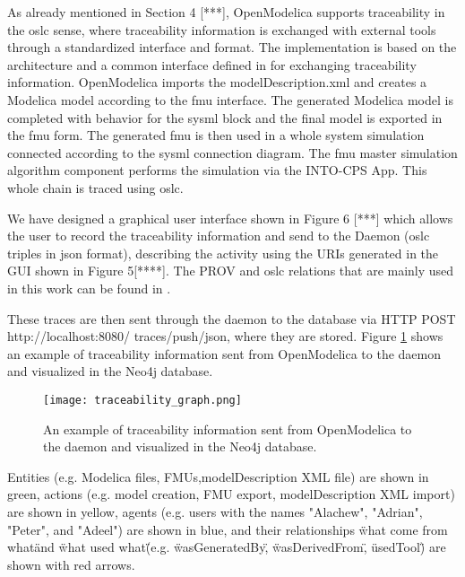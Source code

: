 As already mentioned in Section 4 [***], OpenModelica supports traceability in the \acrshort{oslc} sense, where
traceability information is exchanged with external tools through a standardized interface and format. 
The implementation is based on the architecture and a common interface defined in \cite{intocpskenneth} for 
exchanging traceability information. OpenModelica imports the modelDescription.xml and creates a Modelica model according to the \acrshort{fmu}
interface. The generated Modelica model is completed with behavior for the \acrshort{sysml} block and the final model
is exported in the \acrshort{fmu} form. The generated \acrshort{fmu} is then used in a whole system simulation connected
according to the \acrshort{sysml} connection diagram. The \acrshort{fmu} master simulation algorithm component performs
the simulation via the INTO-CPS App. This whole chain is traced using \acrshort{oslc}.

We have designed a graphical user interface shown in Figure 6 [***] which allows the user to record the
traceability information and send to the Daemon (\acrshort{oslc} triples in \acrshort{json} format), describing the activity
using the URIs generated in the GUI shown in Figure 5[****]. The PROV and \acrshort{oslc} relations that are mainly used
in this work can be found in \cite{intocpsjohn}.
  
These traces are then sent through the daemon to the database via HTTP POST http://localhost:8080/
traces/push/json, where they are stored. Figure \ref{fig:traceabilitygraph} shows an example of traceability information 
sent from OpenModelica to the daemon and visualized in the Neo4j database.
\begin{landscape}
\begin{figure}
	\texttt{[image: traceability\_graph.png]}
	\caption{An example of traceability information sent from OpenModelica to the daemon and visualized in the Neo4j database.}
	\label{fig:traceabilitygraph}
\end{figure}
\end{landscape}

Entities (e.g. Modelica files, FMUs,modelDescription XML file) are shown in green,
actions (e.g. model creation, FMU export, modelDescription XML import) are shown in yellow,
agents (e.g. users with the names {"Alachew"}, {"Adrian"}, {"Peter"}, and {"Adeel")} are shown in blue,
and their relationships \"what come from what\" and \"what used what\" (e.g. \"wasGeneratedBy\", \"wasDerivedFrom\", \"usedTool\") are 
shown with red arrows.

